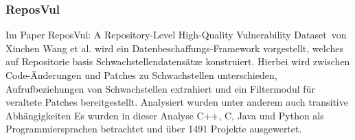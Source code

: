 \subsubsection{ReposVul} \label{sec:ReposVul}
Im Paper \glqq ReposVul: A Repository-Level High-Quality Vulnerability Dataset\grqq~von Xinchen Wang et al. wird ein Datenbeschaffungs-Framework vorgestellt, welches auf Repositorie basis Schwachstellendatensätze konstruiert.
Hierbei wird zwischen Code-Änderungen und Patches zu Schwachstellen unterschieden, Aufrufbeziehungen von Schwachstellen extrahiert und ein Filtermodul für veraltete Patches bereitgestellt.
Analysiert wurden unter anderem auch transitive Abhängigkeiten
Es wurden in dieser Analyse C++, C, Java und Python als Programmiersprachen betrachtet und über 1491 Projekte ausgewertet.
